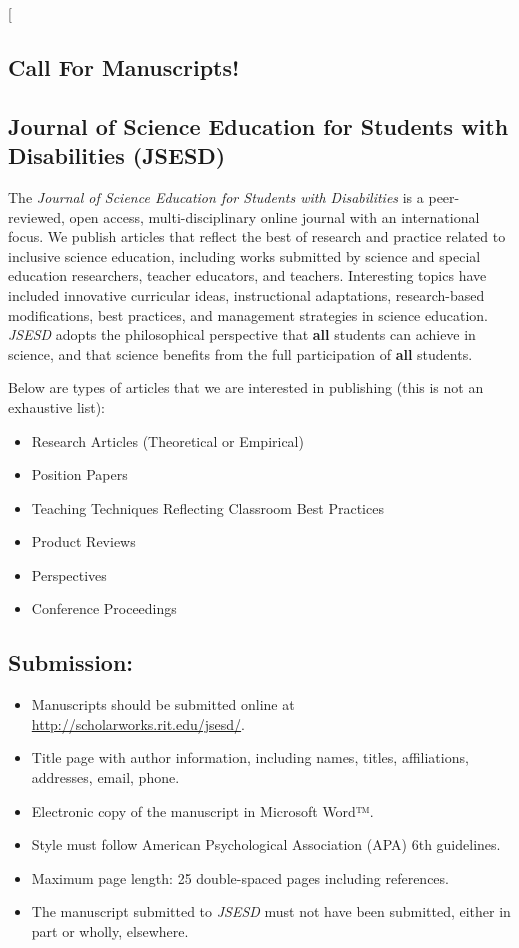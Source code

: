 \documentclass{sig-alternate} %
\begin{document}
\begin{large}
\twocolumn[
\begin{@twocolumnfalse}
\section*{Call For Manuscripts!}
\subsection*{Journal of Science Education for Students with Disabilities (JSESD)}

The \textit{Journal of Science Education for Students with Disabilities} is a peer-reviewed, open access, multi-disciplinary online journal with an international focus. We publish articles that reflect the best of research and practice related to inclusive science education, including works submitted by science and special education researchers, teacher educators, and teachers. Interesting topics have included innovative curricular ideas, instructional adaptations, research-based modifications, best practices, and management strategies in science education. \textit{JSESD} adopts the philosophical perspective that \textbf{all} students can achieve in science, and that science benefits from the full participation of \textbf{all} students.

Below are types of articles that we are interested in publishing (this is not an exhaustive list):
\begin{itemize}
    \item Research Articles (Theoretical or Empirical)
    \item Position Papers
    \item Teaching Techniques Reflecting Classroom Best Practices
    \item Product Reviews
    \item Perspectives
    \item Conference Proceedings
\end{itemize}

\subsection*{Submission:}
\begin{itemize}
    \item Manuscripts should be submitted online at \url{http://scholarworks.rit.edu/jsesd/}.
    \item Title page with author information, including names, titles, affiliations, addresses, email, phone.
    \item Electronic copy of the manuscript in Microsoft Word™.
    \item Style must follow American Psychological Association (APA) 6th guidelines.
    \item Maximum page length: 25 double-spaced pages including references.
    \item The manuscript submitted to \textit{JSESD} must not have been submitted, either in part or wholly, elsewhere.
\end{itemize}


\end{@twocolumnfalse}
\end{large}
\end{document}
